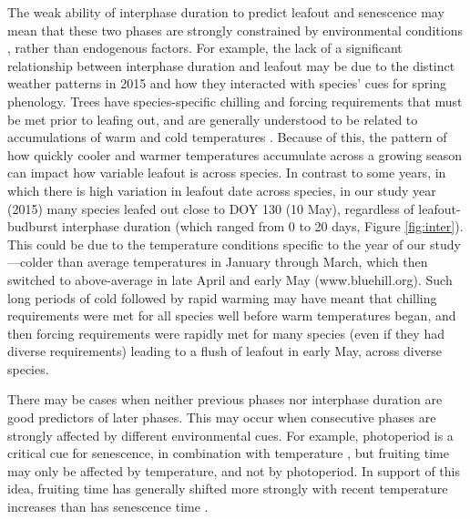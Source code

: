 \documentclass{article}
\begin{document}
\par The weak ability of interphase duration to predict leafout and senescence may mean that these two phases are strongly constrained by environmental conditions \citep{fenner1998}, rather than endogenous factors. For example, the lack of a significant relationship between interphase duration and leafout may be due to the distinct weather patterns in 2015 and how they interacted with species' cues for spring phenology.  Trees have species-specific chilling and forcing requirements that must be met prior to leafing out, and are generally understood to be related to accumulations of warm and cold temperatures \citep[e.g.,][]{schwartz2010,chuine2010,clark2014b,flynnrev}. Because of this, the pattern of how quickly cooler and warmer temperatures accumulate across a growing season can impact how variable leafout is across species. In contrast to some years, in which there is high variation in leafout date across species, in our study year (2015) many species leafed out close to DOY 130 (10 May), regardless of leafout-budburst interphase duration (which ranged from 0 to 20 days, Figure \ref{fig:inter}).  This could be due to the temperature conditions specific to the year of our study---colder than average temperatures in January through March, which then switched to above-average in late April and early May (www.bluehill.org). Such long periods of cold followed by rapid warming may have meant that chilling requirements were met for all species well before warm temperatures began, and then forcing requirements were rapidly met for many species (even if they had diverse requirements) leading to a flush of leafout in early May, across diverse species. 

\par There may be cases when neither previous phases nor interphase duration are good predictors of later phases. This may occur when consecutive phases are strongly affected by different environmental cues. For example, photoperiod is a critical cue for senescence, in combination with temperature \citep{delpierre2009}, but fruiting time may only be affected by temperature, and not by photoperiod. In support of this idea, fruiting time has generally shifted more strongly with recent temperature increases than has senescence time \citep{menzel2006}.
\end{document}
